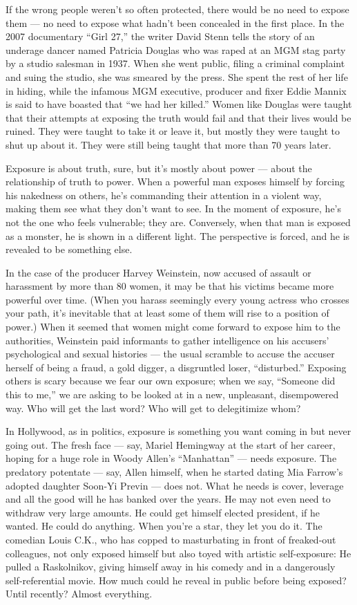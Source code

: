 If the wrong people weren't so often protected, there would be no need
to expose them --- no need to expose what hadn't been concealed in the
first place. In the 2007 documentary ``Girl 27,'' the writer David Stenn
tells the story of an underage dancer named Patricia Douglas who was
raped at an MGM stag party by a studio salesman in 1937. When she went
public, filing a criminal complaint and suing the studio, she was
smeared by the press. She spent the rest of her life in hiding, while
the infamous MGM executive, producer and fixer Eddie Mannix is said to
have boasted that ``we had her killed.'' Women like Douglas were taught
that their attempts at exposing the truth would fail and that their
lives would be ruined. They were taught to take it or leave it, but
mostly they were taught to shut up about it. They were still being
taught that more than 70 years later.

Exposure is about truth, sure, but it's mostly about power --- about the
relationship of truth to power. When a powerful man exposes himself by
forcing his nakedness on others, he's commanding their attention in a
violent way, making them see what they don't want to see. In the moment
of exposure, he's not the one who feels vulnerable; they are.
Conversely, when that man is exposed as a monster, he is shown in a
different light. The perspective is forced, and he is revealed to be
something else.

In the case of the producer Harvey Weinstein, now accused of assault or
harassment by more than 80 women, it may be that his victims became more
powerful over time. (When you harass seemingly every young actress who
crosses your path, it's inevitable that at least some of them will rise
to a position of power.) When it seemed that women might come forward to
expose him to the authorities, Weinstein paid informants to gather
intelligence on his accusers' psychological and sexual histories --- the
usual scramble to accuse the accuser herself of being a fraud, a gold
digger, a disgruntled loser, ``disturbed.'' Exposing others is scary
because we fear our own exposure; when we say, ``Someone did this to
me,'' we are asking to be looked at in a new, unpleasant, disempowered
way. Who will get the last word? Who will get to delegitimize whom?

In Hollywood, as in politics, exposure is something you want coming in
but never going out. The fresh face --- say, Mariel Hemingway at the
start of her career, hoping for a huge role in Woody Allen's
``Manhattan'' --- needs exposure. The predatory potentate --- say, Allen
himself, when he started dating Mia Farrow's adopted daughter Soon-Yi
Previn --- does not. What he needs is cover, leverage and all the good
will he has banked over the years. He may not even need to withdraw very
large amounts. He could get himself elected president, if he wanted. He
could do anything. When you're a star, they let you do it. The comedian
Louis C.K., who has copped to masturbating in front of freaked-out
colleagues, not only exposed himself but also toyed with artistic
self-exposure: He pulled a Raskolnikov, giving himself away in his
comedy and in a dangerously self-referential movie. How much could he
reveal in public before being exposed? Until recently? Almost
everything.

